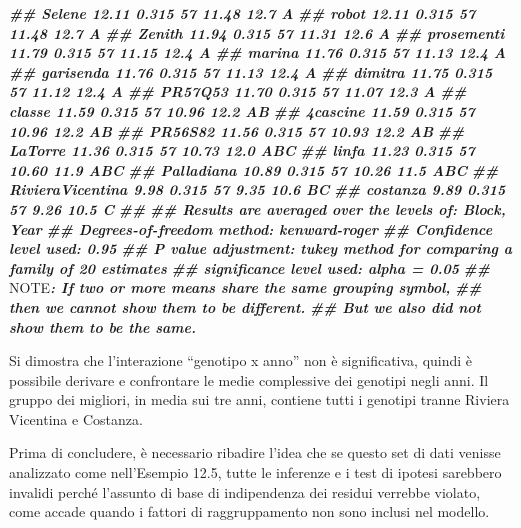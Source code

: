 \documentclass[
  12pt,
]{book}
\newenvironment{Shaded}{\begin{snugshade}}{\end{snugshade}}
\newcommand{\AlertTok}[1]{\textcolor[rgb]{0.94,0.16,0.16}{#1}}
\newcommand{\DocumentationTok}[1]{\textcolor[rgb]{0.56,0.35,0.01}{\textbf{\textit{#1}}}}
\begin{document}
\begin{Shaded}
\begin{Highlighting}[]
\DocumentationTok{\#\#  Selene             12.11 0.315 57    11.48     12.7  A    }
\DocumentationTok{\#\#  robot              12.11 0.315 57    11.48     12.7  A    }
\DocumentationTok{\#\#  Zenith             11.94 0.315 57    11.31     12.6  A    }
\DocumentationTok{\#\#  prosementi         11.79 0.315 57    11.15     12.4  A    }
\DocumentationTok{\#\#  marina             11.76 0.315 57    11.13     12.4  A    }
\DocumentationTok{\#\#  garisenda          11.76 0.315 57    11.13     12.4  A    }
\DocumentationTok{\#\#  dimitra            11.75 0.315 57    11.12     12.4  A    }
\DocumentationTok{\#\#  PR57Q53            11.70 0.315 57    11.07     12.3  A    }
\DocumentationTok{\#\#  classe             11.59 0.315 57    10.96     12.2  AB   }
\DocumentationTok{\#\#  4cascine           11.59 0.315 57    10.96     12.2  AB   }
\DocumentationTok{\#\#  PR56S82            11.56 0.315 57    10.93     12.2  AB   }
\DocumentationTok{\#\#  LaTorre            11.36 0.315 57    10.73     12.0  ABC  }
\DocumentationTok{\#\#  linfa              11.23 0.315 57    10.60     11.9  ABC  }
\DocumentationTok{\#\#  Palladiana         10.89 0.315 57    10.26     11.5  ABC  }
\DocumentationTok{\#\#  RivieraVicentina    9.98 0.315 57     9.35     10.6   BC  }
\DocumentationTok{\#\#  costanza            9.89 0.315 57     9.26     10.5    C  }
\DocumentationTok{\#\# }
\DocumentationTok{\#\# Results are averaged over the levels of: Block, Year }
\DocumentationTok{\#\# Degrees{-}of{-}freedom method: kenward{-}roger }
\DocumentationTok{\#\# Confidence level used: 0.95 }
\DocumentationTok{\#\# P value adjustment: tukey method for comparing a family of 20 estimates }
\DocumentationTok{\#\# significance level used: alpha = 0.05 }
\DocumentationTok{\#\# }\AlertTok{NOTE}\DocumentationTok{: If two or more means share the same grouping symbol,}
\DocumentationTok{\#\#       then we cannot show them to be different.}
\DocumentationTok{\#\#       But we also did not show them to be the same.}
\end{Highlighting}
\end{Shaded}

Si dimostra che l'interazione ``genotipo x anno'' non è significativa, quindi è possibile derivare e confrontare le medie complessive dei genotipi negli anni. Il gruppo dei migliori, in media sui tre anni, contiene tutti i genotipi tranne Riviera Vicentina e Costanza.

Prima di concludere, è necessario ribadire l'idea che se questo set di dati venisse analizzato come nell'Esempio 12.5, tutte le inferenze e i test di ipotesi sarebbero invalidi perché l'assunto di base di indipendenza dei residui verrebbe violato, come accade quando i fattori di raggruppamento non sono inclusi nel modello.
\end{document}
